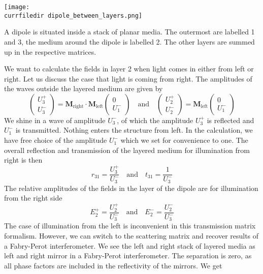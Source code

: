 \begin{marginfigure}
  \texttt{[image: \\currfiledir dipole\_between\_layers.png]}
  \caption{A dipole is situated inside a stack of planar media. The outermost are labelled 1 and 3, the  medium around the dipole is labelled 2. The other layers are summed up in the respective matrices. }
\end{marginfigure}


We want to calculate the fields in layer 2 when light comes in either from left or right. Let us discuss the case that light is coming from right. The amplitudes of the waves outside the layered medium are given by
\begin{equation}
\begin{pmatrix}
U_3^+ \\ U_3^-
\end{pmatrix}
= 
\mathbf{M}_\text{right} \cdot \mathbf{M}_\text{left}
\begin{pmatrix}
0 \\ U_1^-
\end{pmatrix}
\quad
\text{and}
\quad
\begin{pmatrix}
U_2^+ \\ U_2^-
\end{pmatrix}
= 
\mathbf{M}_\text{left}
\begin{pmatrix}
0 \\ U_1^-
\end{pmatrix}
\end{equation}
We shine in a wave of amplitude $U_3^-$, of which the amplitude $U_3^+$ is reflected and $ U_1^-$ is transmitted. Nothing enters the structure from left. In the calculation, we have free choice of the amplitude $U_1^-$ which we set for convenience to one. The overall reflection and transmission of the layered medium for illumination from right is then
\begin{equation}
 r_{31} = \frac{U_3^+}{U_3^-}
 \quad
 \text{and}
 \quad
 t_{31} = \frac{1}{U_3^-}
\end{equation}
The relative amplitudes of the fields in the layer of the dipole  are for illumination from the right side
\begin{equation}
E_2^+ = \frac{U_2^+}{U_3^-}
 \quad
 \text{and}
 \quad
 E_2^- = \frac{U_2^-}{U_3^-}
\end{equation}
The case of illumination from the left is inconvenient in this transmission matrix formalism. However, we can switch to the scattering matrix and recover results of a Fabry-Perot interferometer. We see the left and right stack of layered media as left and right mirror in a Fabry-Perot interferometer. The separation is zero, as all phase factors are included in the reflectivity of the mirrors. We get
